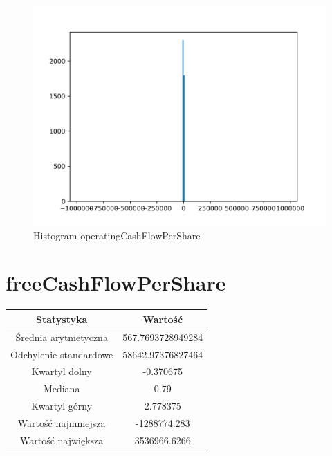 \documentclass{article}
\begin{document}
\begin{figure}[h!]
    \includegraphics[width=\linewidth]{variables/operatingCashFlowPerShare.png}
    \caption{Histogram operatingCashFlowPerShare }
\end{figure}\section{ freeCashFlowPerShare }

\begin{center}
    \begin{tabular}{|c | c|} 
    \hline
    Statystyka & Wartość \\
    \hline\hline
    Średnia arytmetyczna & 567.7693728949284 \\ 
    \hline
    Odchylenie standardowe & 58642.97376827464 \\
    \hline
    Kwartyl dolny & -0.370675 \\
    \hline
    Mediana & 0.79 \\
    \hline
    Kwartyl górny & 2.778375 \\
    \hline
    Wartość najmniejsza & -1288774.283 \\
    \hline
    Wartość największa & 3536966.6266 \\
    \hline
   \end{tabular}
\end{center}
\end{document}
